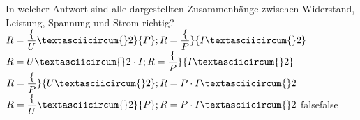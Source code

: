     {In welcher Antwort sind alle dargestellten Zusammenhänge zwischen Widerstand, Leistung, Spannung und Strom richtig?}
    {$R = \dfrac\{U\textasciicircum{}2\}\{P\};  R = \dfrac\{P\}\{I\textasciicircum{}2\}$}
    {$R = U\textasciicircum{}2\cdot I;  R = \dfrac\{P\}\{I\textasciicircum{}2\}$}
    {$R = \dfrac\{P\}\{U\textasciicircum{}2\};  R = P\cdot I\textasciicircum{}2$}
    {$R = \dfrac\{U\textasciicircum{}2\}\{P\};  R = P\cdot I\textasciicircum{}2$}
    {false}{false}
